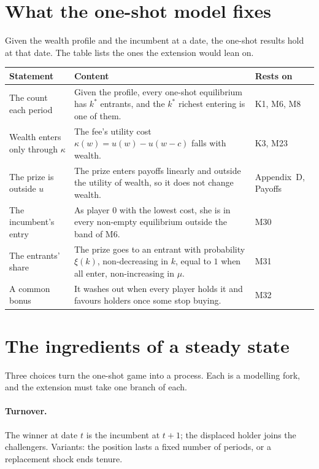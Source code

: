 \documentclass[11pt]{article}
\begin{document}
\section{What the one-shot model fixes}

Given the wealth profile and the incumbent at a date, the one-shot results hold
at that date. The table lists the ones the extension would lean on.

\begin{center}
\small
\begin{tabular}{@{}P{4.4cm}P{8.2cm}P{2.6cm}@{}}
\toprule
\textbf{Statement} & \textbf{Content} & \textbf{Rests on} \\
\midrule
The count each period & Given the profile, every one-shot equilibrium has
  $k^*$ entrants, and the $k^*$ richest entering is one of them. & K1, M6, M8 \\
  \addlinespace
Wealth enters only through $\kappa$ & The fee's utility cost
  $\kappa(w)=u(w)-u(w-c)$ falls with wealth. & K3, M23 \\ \addlinespace
The prize is outside $u$ & The prize enters payoffs linearly and outside the
  utility of wealth, so it does not change wealth. & Appendix~D, Payoffs \\
  \addlinespace
The incumbent's entry & As player $0$ with the lowest cost, she is in every
  non-empty equilibrium outside the band of M6. & M30 \\ \addlinespace
The entrants' share & The prize goes to an entrant with probability $\xi(k)$,
  non-decreasing in $k$, equal to $1$ when all enter, non-increasing in $\mu$. &
  M31 \\ \addlinespace
A common bonus & It washes out when every player holds it and favours holders
  once some stop buying. & M32 \\
\bottomrule
\end{tabular}
\end{center}

\section{The ingredients of a steady state}

Three choices turn the one-shot game into a process. Each is a modelling fork,
and the extension must take one branch of each.

\paragraph{Turnover.} The winner at date $t$ is the incumbent at $t+1$; the
displaced holder joins the challengers. Variants: the position lasts a fixed
number of periods, or a replacement shock ends tenure.
\end{document}
